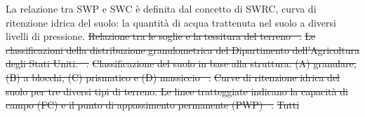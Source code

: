\documentclass[12pt,a4paper,openright,twoside, openany]{book} %
\providecommand{\DIFdel}[1]{{\protect\color{red}\sout{#1}}}                      %
\providecommand{\DIFaddbegin}{} %
\providecommand{\DIFdelbegin}{} %
\providecommand{\DIFdelend}{} %
\providecommand{\DIFdelFL}[1]{\DIFdel{#1}} %
\begin{document}
La relazione tra \ac{SWP} e \ac{SWC} è definita dal concetto di \ac{SWRC}, curva di ritenzione idrica del suolo: la quantità di acqua trattenuta nel suolo a diversi livelli di pressione\cite{assouline1998water}.
\DIFdelbegin %
{%
\DIFdelFL{Relazione tra le soglie e la tessitura del terreno\mbox{%
\cite{Ding2022}}\hskip0pt%
.}}
{%
\DIFdelFL{Le classificazioni della distribuzione granulometrica del Dipartimento dell'Agricoltura degli Stati Uniti.\mbox{%
\cite{RAI2017505}}\hskip0pt%
.}}
{%
\DIFdelFL{Classificazione del suolo in base alla struttura: (A) granulare, (B) a blocchi, (C) prismatico e (D) massiccio\mbox{%
\cite{RAI2017505}}\hskip0pt%
.}}
{%
\DIFdelFL{Curve di ritenzione idrica del suolo per tre diversi tipi di terreno. Le linee tratteggiate indicano la capacità di campo (FC) e il punto di appassimento permanente (PWP)\mbox{%
\cite{Fuchsberger1023}}\hskip0pt%
.}}
\DIFdel{Tutti }\DIFdelend \DIFaddbegin
\end{document}
